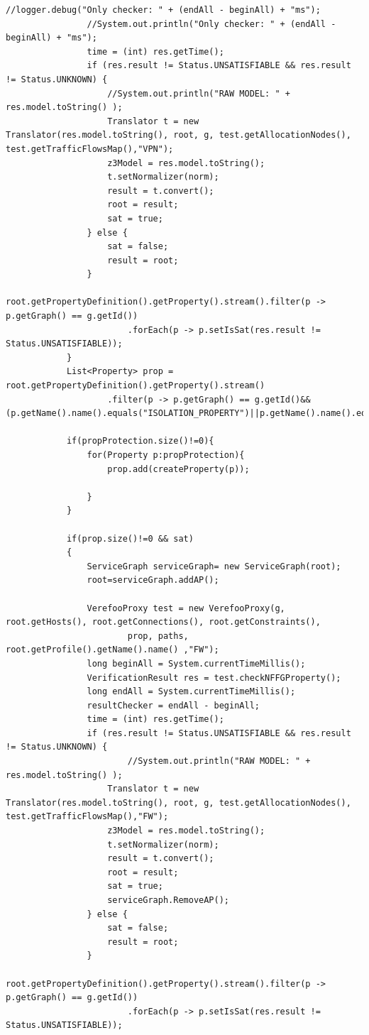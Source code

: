 \begin{lstlisting}[caption={Esempio di codice Java}, label=lst:java_example]
                //logger.debug("Only checker: " + (endAll - beginAll) + "ms");
                //System.out.println("Only checker: " + (endAll - beginAll) + "ms");
                time = (int) res.getTime();
                if (res.result != Status.UNSATISFIABLE && res.result != Status.UNKNOWN) {
                    //System.out.println("RAW MODEL: " + res.model.toString() );
                    Translator t = new Translator(res.model.toString(), root, g, test.getAllocationNodes(), test.getTrafficFlowsMap(),"VPN");
                    z3Model = res.model.toString();
                    t.setNormalizer(norm);
                    result = t.convert();
                    root = result;
                    sat = true;
                } else {
                    sat = false;
                    result = root;
                }
                root.getPropertyDefinition().getProperty().stream().filter(p -> p.getGraph() == g.getId())
                        .forEach(p -> p.setIsSat(res.result != Status.UNSATISFIABLE));
            }
            List<Property> prop = root.getPropertyDefinition().getProperty().stream()
                    .filter(p -> p.getGraph() == g.getId()&& (p.getName().name().equals("ISOLATION_PROPERTY")||p.getName().name().equals("REACHABILITY_PROPERTY"))).collect(Collectors.toList());

            if(propProtection.size()!=0){
                for(Property p:propProtection){
                    prop.add(createProperty(p));

                }
            }

            if(prop.size()!=0 && sat)
            {
                ServiceGraph serviceGraph= new ServiceGraph(root);
                root=serviceGraph.addAP();

                VerefooProxy test = new VerefooProxy(g, root.getHosts(), root.getConnections(), root.getConstraints(),
                        prop, paths, root.getProfile().getName().name() ,"FW");
                long beginAll = System.currentTimeMillis();
                VerificationResult res = test.checkNFFGProperty();
                long endAll = System.currentTimeMillis();
                resultChecker = endAll - beginAll;
                time = (int) res.getTime();
                if (res.result != Status.UNSATISFIABLE && res.result != Status.UNKNOWN) {
                        //System.out.println("RAW MODEL: " + res.model.toString() );
                    Translator t = new Translator(res.model.toString(), root, g, test.getAllocationNodes(), test.getTrafficFlowsMap(),"FW");
                    z3Model = res.model.toString();
                    t.setNormalizer(norm);
                    result = t.convert();
                    root = result;
                    sat = true;
                    serviceGraph.RemoveAP();
                } else {
                    sat = false;
                    result = root;
                }
                root.getPropertyDefinition().getProperty().stream().filter(p -> p.getGraph() == g.getId())
                        .forEach(p -> p.setIsSat(res.result != Status.UNSATISFIABLE));


\end{lstlisting}
